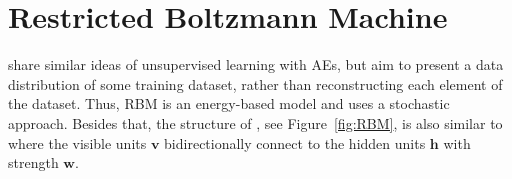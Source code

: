 \section{Restricted Boltzmann Machine}
\label{sec:rbm}
\DIFdelbegin {}\DIFdelend \DIFaddbegin {} \DIFaddend share similar ideas of unsupervised learning with AEs, but aim to present a data distribution of some training dataset, rather than reconstructing each element of the dataset.
Thus, \DIFaddbegin {}\DIFaddend RBM is an energy-based model and uses a stochastic approach.
Besides that, the structure of \DIFdelbegin {}\DIFdelend \DIFaddbegin {}\DIFaddend , see Figure~\ref{fig:RBM}, is also similar to \DIFdelbegin {}\DIFdelend \DIFaddbegin {}\DIFaddend where the visible units $\mathbf{v}$ bidirectionally connect to the hidden units $\mathbf{h}$ with strength $\mathbf{w}$.


